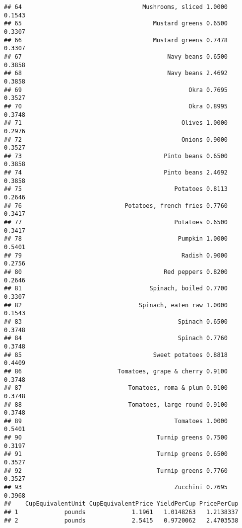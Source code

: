\documentclass[
]{article}
\begin{document}
\begin{verbatim}
## 64                                  Mushrooms, sliced 1.0000            0.1543
## 65                                     Mustard greens 0.6500            0.3307
## 66                                     Mustard greens 0.7478            0.3307
## 67                                         Navy beans 0.6500            0.3858
## 68                                         Navy beans 2.4692            0.3858
## 69                                               Okra 0.7695            0.3527
## 70                                               Okra 0.8995            0.3748
## 71                                             Olives 1.0000            0.2976
## 72                                             Onions 0.9000            0.3527
## 73                                        Pinto beans 0.6500            0.3858
## 74                                        Pinto beans 2.4692            0.3858
## 75                                           Potatoes 0.8113            0.2646
## 76                             Potatoes, french fries 0.7760            0.3417
## 77                                           Potatoes 0.6500            0.3417
## 78                                            Pumpkin 1.0000            0.5401
## 79                                             Radish 0.9000            0.2756
## 80                                        Red peppers 0.8200            0.2646
## 81                                    Spinach, boiled 0.7700            0.3307
## 82                                 Spinach, eaten raw 1.0000            0.1543
## 83                                            Spinach 0.6500            0.3748
## 84                                            Spinach 0.7760            0.3748
## 85                                     Sweet potatoes 0.8818            0.4409
## 86                           Tomatoes, grape & cherry 0.9100            0.3748
## 87                              Tomatoes, roma & plum 0.9100            0.3748
## 88                              Tomatoes, large round 0.9100            0.3748
## 89                                           Tomatoes 1.0000            0.5401
## 90                                      Turnip greens 0.7500            0.3197
## 91                                      Turnip greens 0.6500            0.3527
## 92                                      Turnip greens 0.7760            0.3527
## 93                                           Zucchini 0.7695            0.3968
##    CupEquivalentUnit CupEquivalentPrice YieldPerCup PricePerCup
## 1             pounds             1.1961   1.0148263   1.2138337
## 2             pounds             2.5415   0.9720062   2.4703538

\end{verbatim}
\end{document}
